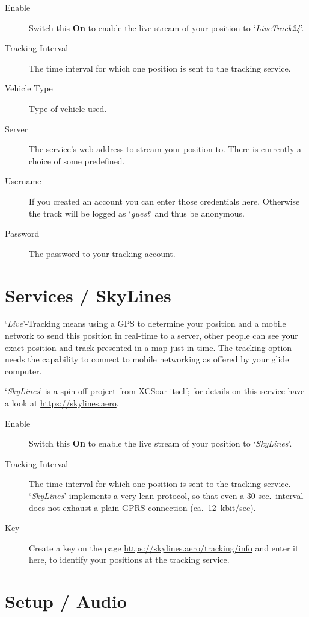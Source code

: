\begin{description}
\item[Enable]  Switch this {\bf On} to enable the live stream of 
  your position to `{\em LiveTrack24}'.
\item[Tracking Interval]  The time interval for which one position is sent to
  the tracking service.
\item[Vehicle Type]  Type of vehicle used.
\item[Server]  The service's web address to stream your position to. There is currently 
  a choice of some predefined.
\item[Username]  If you created an account you can enter those credentials here. 
  Otherwise the track will be logged as `{\it guest}' and thus be anonymous.  
\item[Password]  The password to your tracking account.
\end{description}


\section{Services / SkyLines}

`{\it Live}'-Tracking means using a GPS to determine your position and a mobile 
network to send this position in real-time to a server, other people can see 
your exact position and track presented in a map just in time.
The tracking option needs the capability to connect to mobile networking as offered by 
your glide computer.

`{\em SkyLines}' is a spin-off project from XCSoar itself; for details on this
service have a look at \url{https://skylines.aero}.

\begin{description}
\item[Enable]  Switch this {\bf On} to enable the live stream of 
  your position to `{\em SkyLines}'.
\item[Tracking Interval]  The time interval for which one position is sent to
  the tracking service. `{\em SkyLines}' implements a very lean protocol, so that even
  a 30 sec.\ interval does not exhaust a plain GPRS connection (ca.\ 12~kbit/sec).
\item[Key]  Create a key on the page \url{https://skylines.aero/tracking/info} 
  and enter it here, to identify your positions at the tracking service.
\end{description}


\section{Setup / Audio}\label{sec:audiovario-gauge}

